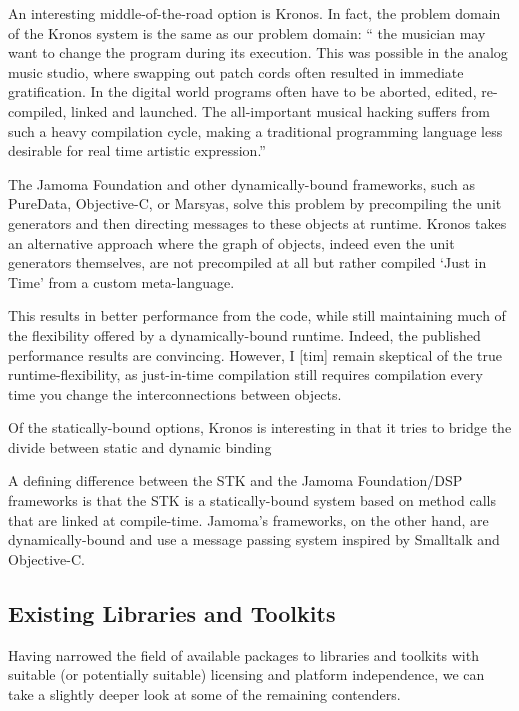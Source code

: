 \documentclass[twoside,10pt]{article}
\begin{document}
An interesting middle-of-the-road option is Kronos.  In fact, the problem domain of the Kronos system is the same as our problem domain: `` the musician may want to change the program during its execution. This was possible in the analog music studio, where swapping out patch cords often resulted in immediate gratification. In the digital world programs often have to be aborted, edited, re- compiled, linked and launched. The all-important musical hacking suffers from such a heavy compilation cycle, making a traditional programming language less desirable for real time artistic expression.'' \cite{Norilo:2009}

The Jamoma Foundation and other dynamically-bound frameworks, such as PureData, Objective-C, or Marsyas, solve this problem by precompiling the unit generators and then directing messages to these objects at runtime.  Kronos takes an alternative approach where the graph of objects, indeed even the unit generators themselves, are not precompiled at all but rather compiled `Just in Time' from a custom meta-language. 

This results in better performance from the code, while still maintaining much of the flexibility offered by a dynamically-bound runtime.  Indeed, the published performance results are convincing.  However, I [tim] remain skeptical of the true runtime-flexibility, as just-in-time compilation still requires compilation every time you change the interconnections between objects.

Of the statically-bound options, Kronos is interesting in that it tries to bridge the divide between static and dynamic binding 



A defining difference between the STK and the Jamoma Foundation/DSP frameworks is that the STK is a statically-bound system based on method calls that are linked at compile-time.  Jamoma's frameworks, on the other hand, are dynamically-bound and use a message passing system inspired by Smalltalk\cite{Krasner:1988} and Objective-C\cite{Cox:1986}.
	
	
	

\subsection{Existing Libraries and Toolkits}

Having narrowed the field of available packages to libraries and toolkits with suitable (or potentially suitable) licensing and platform independence, we can take a slightly deeper look at some of the remaining contenders.
\end{document}
